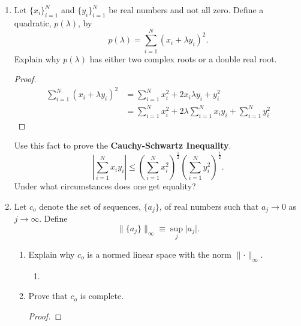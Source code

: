 \documentclass{article}
\begin{document}
\begin{enumerate}
\begin{enumerate}
\begin{proof}
\begin{align*}
                                    \\
                                    \therefore\lVert x\rVert_2 & \leq \lVert x\rVert_1\leq \lVert x\rVert_2
                              \end{align*}
                        \end{proof}
                  \item Prove that the sup norm and the $L_1$ norm are not
                        equivalent on $C[a,b]$.
                        \begin{proof}
                        \end{proof}
            \end{enumerate}
            \setcounter{enumi}{9}
      \item Let $\{x_i\}_{i=1}^N$ and $\{y_i\}_{i=1}^N$ be real numbers and not
            all zero. Define a quadratic, $p(\lambda)$, by
            \[
                  p(\lambda)=\sum_{i=1}^N(x_i+\lambda y_i)^2.
            \]
            Explain why $p(\lambda)$ has either two complex roots or a double
            real root.
            \begin{proof}
                  \begin{align*}
                        \sum_{i=1}^N(x_i+\lambda y_i)^2 & = \sum_{i=1}^Nx_i^2+2x_i\lambda y_i + y_i^2                          \\
                                                        & = \sum_{i=1}^Nx_i^2 + 2\lambda\sum_{i=1}^Nx_iy_i + \sum_{i=1}^Ny_i^2
                  \end{align*}
            \end{proof}
            Use this fact to prove the \textbf{Cauchy-Schwartz
                  Inequality}.
            \begin{equation}
                  \left\lvert\sum_{i=1}^Nx_iy_i\right\rvert \leq
                  \left(\sum_{i=1}^Nx_i^2\right)^\frac{1}{2}
                  \left(\sum_{i=1}^Ny_i^2\right)^\frac{1}{2}.
            \end{equation}
            Under what circumstances does one get equality?
      \item Let $c_o$ denote the set of sequences, $\{a_j\}$, of real numbers such
            that $a_j\to 0$ as $j\to \infty$. Define
            \[
                  \lVert\{a_j\}\rVert_\infty\equiv\sup_j\lvert a_j\rvert.
            \]
            \begin{enumerate}
                  \item Explain why $c_o$ is a normed linear space with the norm
                        $\lVert\cdot\rVert_\infty$.
                        \begin{enumerate}
                              \item 
                        \end{enumerate}
                  \item Prove that $c_o$ is complete.
                        \begin{proof}
                              

\end{proof}
\end{enumerate}
\end{enumerate}
\end{document}
